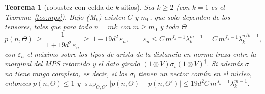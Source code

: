 \documentclass[11pt,a4paper]{article}
\newtheorem{teorema}{Teorema}
\theoremstyle{remark}
\begin{document}
\begin{teorema}[robustez con celda de $k$ sitios]\label{teo:celda}
Sea $k\ge2$ (con $k=1$ es el Teorema~\ref{teo:mps}). Bajo (M$_k$) existen $C$ y $m_0$, que solo dependen de los tensores, tales que para todo
$n=mk$ con $m\ge m_0$ y toda $\Theta$
\[
  p(n,\Theta)\ \ge\ \frac1{1+19d^2\,\varepsilon_n}\ \ge\ 1-19d^2\,\varepsilon_n,\qquad \varepsilon_n\le C\,m^{J_k-1}\lambda_k^{m-1}=C\,m^{J_k-1}\lambda_k^{n/k-1},
\]
con $\varepsilon_n$ el máximo sobre los tipos de arista de la distancia en norma traza entre la
marginal del MPS retorcido y el dato girado $(1\otimes V)\sigma_i(1\otimes V)^\dagger$.
Si además $\sigma$ no tiene rango completo, es decir, si los $\sigma_i$ tienen un vector común en
el núcleo, entonces $p(n,\Theta)\le1$ y
$\sup_{\Theta,\Theta'}|p(n,\Theta)-p(n,\Theta')|\le19d^2C\,m^{J_k-1}\lambda_k^{m-1}$.
\end{teorema}
\end{document}
